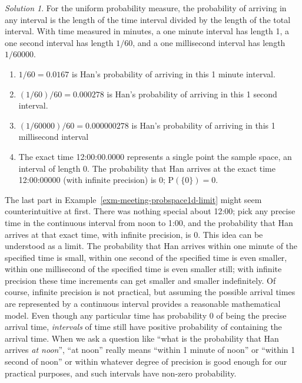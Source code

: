 \documentclass[
  letterpaper,
  DIV=11,
  numbers=noendperiod]{scrreprt}
\providecommand{\tightlist}{%
  \setlength{\itemsep}{0pt}\setlength{\parskip}{0pt}}
\theoremstyle{plain}
\theoremstyle{definition}
\theoremstyle{definition}
\theoremstyle{definition}
\theoremstyle{remark}
\newtheorem{refsolution}{Solution}[chapter]
\begin{document}
\begin{tcolorbox}[enhanced jigsaw, opacityback=0, rightrule=.15mm, coltitle=black, colframe=quarto-callout-tip-color-frame, toprule=.15mm, colbacktitle=quarto-callout-tip-color!10!white, opacitybacktitle=0.6, left=2mm, toptitle=1mm, breakable, title={Solution (click to expand)}, bottomtitle=1mm, colback=white, leftrule=.75mm, titlerule=0mm, arc=.35mm, bottomrule=.15mm]

\begin{refsolution}
For the uniform probability measure, the probability of arriving in any
interval is the length of the time interval divided by the length of the
total interval. With time measured in minutes, a one minute interval has
length 1, a one second interval has length \(1/60\), and a one
millisecond interval has length \(1/60000\).

\begin{enumerate}
\def\labelenumi{\arabic{enumi}.}
\tightlist
\item
  \(1/60 = 0.0167\) is Han's probability of arriving in this 1 minute
  interval.
\item
  \((1/60)/60 = 0.000278\) is Han's probability of arriving in this 1
  second interval.
\item
  \((1/60000)/60 = 0.000000278\) is Han's probability of arriving in
  this 1 millisecond interval
\item
  The exact time 12:00:00.0000 represents a single point the sample
  space, an interval of length 0. The probability that Han arrives at
  the exact time 12:00:00000 (with infinite precision) is 0;
  \(\textrm{P}(\{0\}) = 0\).
\end{enumerate}

\label{sol-meeting-probspace1d-limit}

\end{refsolution}

\end{tcolorbox}

The last part in Example~\ref{exm-meeting-probspace1d-limit} might seem
counterintuitive at first. There was nothing special about 12:00; pick
any precise time in the continuous interval from noon to 1:00, and the
probability that Han arrives at that exact time, with infinite
precision, is 0. This idea can be understood as a limit. The probability
that Han arrives within one minute of the specified time is small,
within one second of the specified time is even smaller, within one
millisecond of the specified time is even smaller still; with infinite
precision these time increments can get smaller and smaller
indefinitely. Of course, infinite precision is not practical, but
assuming the possible arrival times are represented by a continuous
interval provides a reasonable mathematical model. Even though any
particular time has probability 0 of being the precise arrival time,
\emph{intervals} of time still have positive probability of containing
the arrival time. When we ask a question like ``what is the probability
that Han arrives \emph{at noon}'', ``at noon'' really means ``within 1
minute of noon'' or ``within 1 second of noon'' or within whatever
degree of precision is good enough for our practical purposes, and such
intervals have non-zero probability.
\end{document}
